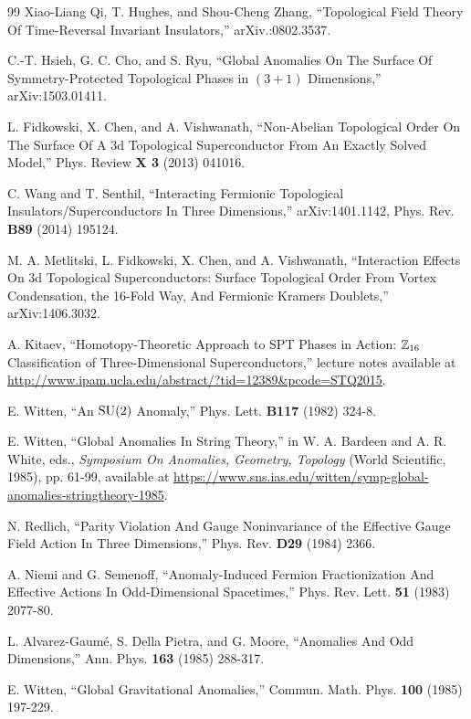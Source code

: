 \begin{thebibliography}{99}
Xiao-Liang Qi, T. Hughes, and Shou-Cheng Zhang, ``Topological Field Theory Of Time-Reversal Invariant Insulators,''
arXiv.:0802.3537.


C.-T. Hsieh, G. C. Cho, and S. Ryu, ``Global Anomalies On The Surface Of Symmetry-Protected Topological Phases in
$(3+1)$ Dimensions,'' arXiv:1503.01411. 

L. Fidkowski, X. Chen, and A. Vishwanath, ``Non-Abelian Topological Order On The
Surface Of A 3d Topological Superconductor From An Exactly Solved Model,''
 Phys. Review {\bf X 3} (2013) 041016. 

C. Wang and T. Senthil, ``Interacting Fermionic Topological Insulators/Superconductors In Three
Dimensions,'' arXiv:1401.1142,  Phys. Rev. {\bf B89} (2014) 195124.

M. A. Metlitski, L. Fidkowski, X. Chen, and A. Vishwanath, ``Interaction Effects On 3d Topological
Superconductors: Surface Topological Order From Vortex Condensation, the 16-Fold Way, And
Fermionic Kramers Doublets,'' arXiv:1406.3032. 

A. Kitaev, ``Homotopy-Theoretic Approach to SPT Phases in Action: ${\mathbb{Z}}_{16}$ Classification of 
Three-Dimensional Superconductors,'' lecture notes available at 
\url{http://www.ipam.ucla.edu/abstract/?tid=12389&pcode=STQ2015}.






E. Witten, ``An ${\mathrm{SU}}(2)$ Anomaly,'' Phys. Lett. {\bf B117} (1982) 324-8.

E. Witten, ``Global Anomalies In String Theory,''  in W. A. Bardeen and A. R. White, eds., 
{\it Symposium On Anomalies, Geometry, Topology} (World Scientific, 1985),
pp. 61-99,
available at \url{https://www.sns.ias.edu/witten/symp-global-anomalies-stringtheory-1985}.


N. Redlich, ``Parity Violation And Gauge Noninvariance of the Effective  Gauge Field Action In Three Dimensions,''  Phys. Rev. {\bf D29} (1984) 2366.

A. Niemi and G. Semenoff, ``Anomaly-Induced Fermion Fractionization And Effective Actions In Odd-Dimensional Spacetimes,''
Phys. Rev. Lett. {\bf 51} (1983) 2077-80.

L. Alvarez-Gaum\'e, S. Della Pietra, and G. Moore, ``Anomalies And Odd Dimensions,'' Ann. Phys. {\bf 163} (1985) 288-317.

E. Witten, ``Global Gravitational Anomalies,'' Commun. Math. Phys. {\bf 100} (1985) 197-229.


\end{thebibliography}

